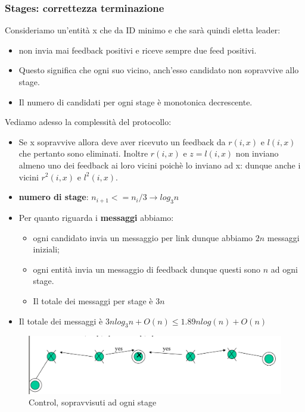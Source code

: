 \documentclass[12pt]{article}
\begin{document}
		\subsubsection{Stages: correttezza terminazione}
			Consideriamo un'entità x che da ID minimo e che sarà quindi eletta leader: 
			\begin{itemize}
				\item non invia mai feedback positivi e riceve sempre due feed positivi.
				\item Questo significa che ogni suo vicino, anch'esso candidato non sopravvive allo stage.
				\item Il numero di candidati per ogni stage è monotonica decrescente.
			\end{itemize}
			Vediamo adesso la complessità del protocollo:
			\begin{itemize}
				\item Se x sopravvive allora deve aver ricevuto un feedback da $r(i,x)$ e $l(i,x)$ che pertanto sono eliminati. Inoltre $r(i,x)$ e $z=l(i,x)$ non inviano almeno uno dei feedback ai loro vicini poichè lo inviano ad x: dunque anche i vicini $r^2(i,x)$ e $l^2(i,x)$.
				\item \textbf{numero di stage}: $n_{i+1}<= n_i/3 \rightarrow log_3n$
				\item Per quanto riguarda i \textbf{messaggi} abbiamo:
				\begin{itemize}
					\item ogni candidato invia un messaggio per link dunque abbiamo $2n$ messaggi iniziali;
					\item ogni entità invia un messaggio di feedback dunque questi sono $n$ ad ogni stage.
					\item Il totale dei messaggi per stage è $3n$
				\end{itemize}
				\item Il totale dei messaggi è $3nlog_3n + O(n) \leq 1.89nlog(n) + O(n)$
			\end{itemize}
	
			\begin{figure}[h!]
				\centering
				\includegraphics[scale=0.50]{img/const.png}
				\caption{Control, sopravvisuti ad ogni stage}
			\end{figure}
		
\end{document}
